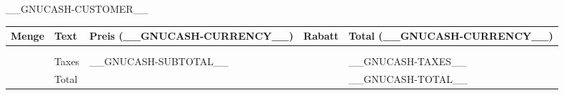 \documentclass[DIN, pagenumber=false, parskip=half,%
               fromalign=left, fromphone=true,%
               fromemail=true, fromurl=false, %
               fromlogo=true, fromrule=false]{scrlttr2}
\newcommand{\amp}{&}
\newcommand{\printQuantity}[1]{
  \gclgetline{Quantity}{#1}%
  \ifthenelse{\equal{\gclgetline{Action}{#1}}{Hours}}{h}{}
  \ifthenelse{\equal{\gclgetline{Action}{#1}}{Material}}{Stk.}{}
}
\newcommand{\printDiscount}[1]{
  \gclgetline{Disc}{#1}%
  \ifthenelse{\equal{\gclgetline{DiscType}{#1}}{PERCENT}}{\%}{}
  \ifthenelse{\equal{\gclgetline{DiscType}{#1}}{VALUE}}{__GNUCASH-CURRENCY__}{}
}
\newcommand{\printline}[5]{
#1\amp#2\amp#3\amp#4\amp#5\\
}
\newcounter{i}
\newcommand{\printtab}[1]{%
  \setcounter{i}{0}
  \whiledo {\value{i} < #1}{
    \printline{\printQuantity{\arabic{i}}}
              {\gclgetline{Description}{\arabic{i}}}
              {\hfill\gclgetline{UnitPrice}{\arabic{i}}}
              {\printDiscount{\arabic{i}}}
              {\hfill\gclgetline{Subtotal}{\arabic{i}}}
    \stepcounter{i}
  }
}
\begin{document}
\begin{letter}{__GNUCASH-CUSTOMER__}
\opening{}

\fontsize{10pt}{1em}\selectfont
\begin{tabularx}{\linewidth}{lXlll}
  Menge & Text & Preis (__GNUCASH-CURRENCY__) & Rabatt & Total (__GNUCASH-CURRENCY__) \\\toprule
  \printtab{\csuse{gclinvoicelines}}\\[-2ex]
  \midrule
  &Taxes&\hfill__GNUCASH-SUBTOTAL__&&\hfill__GNUCASH-TAXES__\\
  &\multicolumn{3}{l}{Total}&\hfill__GNUCASH-TOTAL__\\
  \bottomrule
\end{tabularx}

\closing{}

\end{letter}
\end{document}

